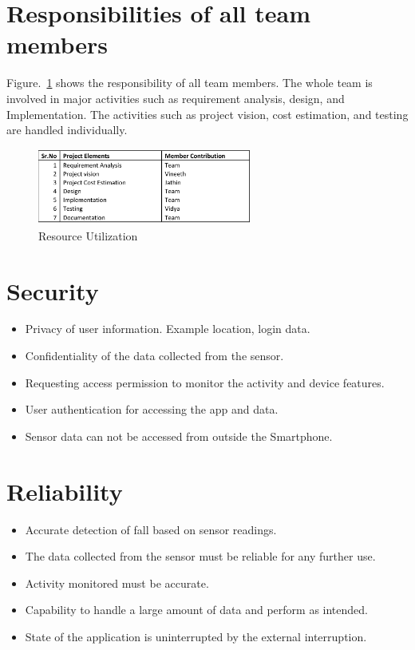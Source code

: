 \documentclass[conference]{IEEEtran}
\begin{document}
\section{Responsibilities of all team members}
Figure.~\ref{resourceUtilization} shows the responsibility of all team members. The whole team is involved in major activities such as requirement analysis, design, and Implementation. The activities such as project vision, cost estimation, and testing are handled individually.
\begin{figure}
\centerline{\includegraphics[width=7cm,height=2.5cm]{resourceUtilization.png}}
\caption{Resource Utilization}
\label{resourceUtilization}
\end{figure}

\section{Security}
\begin{itemize}
\item Privacy of user information. Example location, login data.
\item Confidentiality of the data collected from the sensor.
\item Requesting access permission to monitor the activity and device features.
\item User authentication for accessing the app and data. 
\item Sensor data can not be accessed from outside the Smartphone.
\end{itemize}

\section{Reliability}
\begin{itemize}
\item Accurate detection of fall based on sensor readings.
\item The data collected from the sensor must be reliable for any further use.
\item Activity monitored must be accurate.
\item Capability to handle a large amount of data and perform as intended.
\item State of the application is uninterrupted by the external interruption.
\end{itemize}
\end{document}
